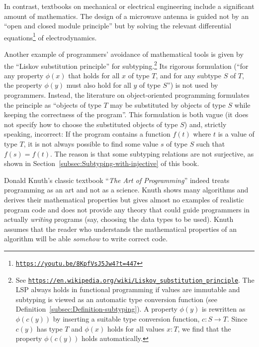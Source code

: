 In contrast, textbooks on mechanical or electrical engineering include
a significant amount of mathematics. The design of a microwave antenna
is guided not by an \textsf{``}open and closed module principle\textsf{''} but by
solving the relevant differential equations\footnote{\texttt{\href{https://youtu.be/8KpfVsJ5Jw4?t=447}{https://youtu.be/8KpfVsJ5Jw4?t=447}}}
of electrodynamics.

Another example of programmers\textsf{'} avoidance of mathematical tools is
given by the \textsf{``}Liskov substitution principle\textsf{''}
for subtyping.\footnote{See \texttt{\href{https://en.wikipedia.org/wiki/Liskov_substitution_principle}{https://en.wikipedia.org/wiki/Liskov\_substitution\_principle}}.
The LSP always holds in functional programming if values are immutable
and subtyping is viewed as an automatic type conversion function (see
Definition~\ref{subsec:Definition-subtyping}). A property $\phi(y)$
is rewritten as $\phi(c(y))$ by inserting a suitable type conversion
function, $c:S\rightarrow T$. Since $c(y)$ has type $T$ and $\phi(x)$
holds for all values $x:T$, we find that the property $\phi(c(y))$
holds automatically.} Its rigorous formulation (\textsf{``}for any property $\phi(x)$ that holds
for all $x$ of type $T$, and for any subtype $S$ of $T$, the property
$\phi(y)$ must also hold for all $y$ of type $S$\textsf{''}) is not used
by programmers. Instead, the literature on object-oriented programming
formulates the principle as \textsf{``}objects of type $T$ may be substituted
by objects of type $S$ while keeping the correctness of the program\textsf{''}.
This formulation  is both vague
(it does not specify how to choose the substituted objects of type
$S$) and, strictly speaking, incorrect: If the program contains a
function $f(t)$ where $t$ is a value of type $T$, it is not always
possible to find some value $s$ of type $S$ such that $f(s)=f(t)$.
The reason is that some subtyping relations are not surjective, as
shown in Section~\ref{subsec:Subtyping-with-injective} of this book.

Donald Knuth\textsf{'}s classic textbook \textsf{``}\emph{The Art of Programming}\textsf{''}
indeed treats programming as an art and not as a science. Knuth shows
many algorithms and derives their mathematical properties but gives
almost no examples of realistic program code and does not provide
any theory that could guide programmers in actually \emph{writing}
programs (say, choosing the data types to be used). Knuth assumes
that the reader who understands the mathematical properties of an
algorithm will be able \emph{somehow} to write correct code.

